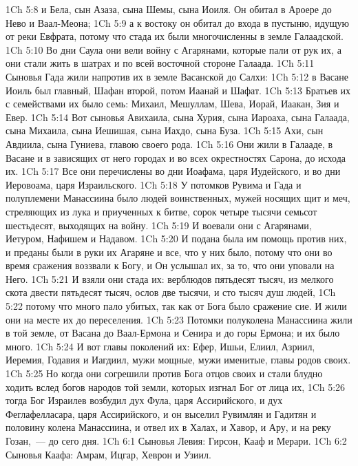 \vs 1Ch 5:8 и Бела, сын Азаза, сына Шемы, сына Иоиля. Он обитал в Ароере до Нево и Ваал-Меона;
\vs 1Ch 5:9 а к востоку он обитал до входа в пустыню, идущую от реки Евфрата, потому что стада их были многочисленны в земле Галаадской.
\vs 1Ch 5:10 Во дни Саула они вели войну с Агарянами, которые пали от рук их, а они стали жить в шатрах и по всей восточной стороне Галаада.
\rsbpar\vs 1Ch 5:11 Сыновья Гада жили напротив их в земле Васанской до Салхи:
\vs 1Ch 5:12 в Васане Иоиль был главный, Шафан второй, потом Иаанай и Шафат.
\vs 1Ch 5:13 Братьев их с семействами их было семь: Михаил, Мешуллам, Шева, Иорай, Иаакан, Зия и Евер.
\vs 1Ch 5:14 Вот сыновья Авихаила, сына Хурия, сына Иароаха, сына Галаада, сына Михаила, сына Иешишая, сына Иахдо, сына Буза.
\vs 1Ch 5:15 Ахи, сын Авдиила, сына Гуниева,  главою своего рода.
\vs 1Ch 5:16 Они жили в Галааде, в Васане и в зависящих от него городах и во всех окрестностях Сарона, до исхода их.
\vs 1Ch 5:17 Все они перечислены во дни Иоафама, царя Иудейского, и во дни Иеровоама, царя Израильского.
\rsbpar\vs 1Ch 5:18 У потомков Рувима и Гада и полуплемени Манассиина было людей воинственных, мужей носящих щит и меч, стреляющих из лука и приученных к битве, сорок четыре тысячи семьсот шестьдесят, выходящих на войну.
\vs 1Ch 5:19 И воевали они с Агарянами, Иетуром, Нафишем и Надавом.
\vs 1Ch 5:20 И подана была им помощь против них, и преданы были в руки их Агаряне и все, что у них было, потому что они во время сражения воззвали к Богу, и Он услышал их, за то, что они уповали на Него.
\vs 1Ch 5:21 И взяли они стада их: верблюдов пятьдесят тысяч, из мелкого скота двести пятьдесят тысяч, ослов две тысячи, и сто тысяч душ людей,
\vs 1Ch 5:22 потому что много пало убитых, так как от Бога было сражение сие. И жили они на месте их до переселения.
\rsbpar\vs 1Ch 5:23 Потомки полуколена Манассиина жили в той земле, от Васана до Ваал-Ермона и Сенира и до горы Ермона; и их было много.
\vs 1Ch 5:24 И вот главы поколений их: Ефер, Ишьи, Елиил, Азриил, Иеремия, Годавия и Иагдиил, мужи мощные, мужи именитые, главы родов своих.
\rsbpar\vs 1Ch 5:25 Но когда они согрешили против Бога отцов своих и стали блудно ходить вслед богов народов той земли, которых изгнал Бог от лица их,
\vs 1Ch 5:26 тогда Бог Израилев возбудил дух Фула, царя Ассирийского, и дух Феглафелласара, царя Ассирийского, и он выселил Рувимлян и Гадитян и половину колена Манассиина, и отвел их в Халах, и Хавор, и Ару, и на реку Гозан,~---  до сего дня.
\vs 1Ch 6:1 Сыновья Левия: Гирсон, Кааф и Мерари.
\vs 1Ch 6:2 Сыновья Каафа: Амрам, Ицгар, Хеврон и Узиил.
